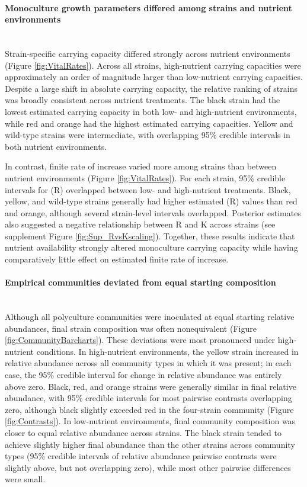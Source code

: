 \paragraph*{Monoculture growth parameters differed among strains and nutrient environments}\mbox{}\\
Strain-specific carrying capacity differed strongly across nutrient environments (Figure \ref{fig:VitalRates}). Across all strains, high-nutrient carrying capacities were approximately an order of magnitude larger than low-nutrient carrying capacities. Despite a large shift in absolute carrying capacity, the relative ranking of strains was broadly consistent across nutrient treatments. The black strain had the lowest estimated carrying capacity in both low- and high-nutrient environments, while red and orange had the highest estimated carrying capacities. Yellow and wild-type strains were intermediate, with overlapping 95\% credible intervals in both nutrient environments.

In contrast, finite rate of increase varied more among strains than between nutrient environments (Figure \ref{fig:VitalRates}). For each strain, 95\% credible intervals for (R) overlapped between low- and high-nutrient treatments. Black, yellow, and wild-type strains generally had higher estimated (R) values than red and orange, although several strain-level intervals overlapped. Posterior estimates also suggested a negative relationship between R and K across strains (see supplement Figure \ref{fig:Sup_RvsKscaling}). Together, these results indicate that nutrient availability strongly altered monoculture carrying capacity while having comparatively little effect on estimated finite rate of increase.

\paragraph*{Empirical communities deviated from equal starting composition}\mbox{}\\
Although all polyculture communities were inoculated at equal starting relative abundances, final strain composition was often nonequivalent (Figure \ref{fig:CommunityBarcharts}). These deviations were most pronounced under high-nutrient conditions. In high-nutrient environments, the yellow strain increased in relative abundance across all community types in which it was present; in each case, the 95\% credible interval for change in relative abundance was entirely above zero. Black, red, and orange strains were generally similar in final relative abundance, with 95\% credible intervals for most pairwise contrasts overlapping zero, although black slightly exceeded red in the four-strain community (Figure \ref{fig:Contrasts}). In low-nutrient environments, final community composition was closer to equal relative abundance across strains. The black strain tended to achieve slightly higher final abundance than the other strains across community types (95\% credible intervals of relative abundance pairwise contrasts were slightly above, but not overlapping zero), while most other pairwise differences were small. 



